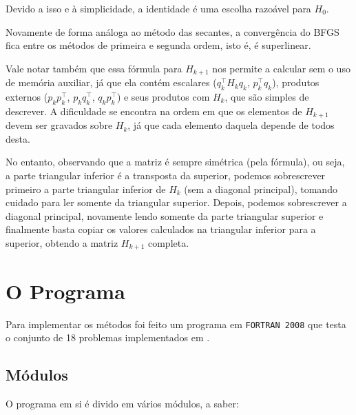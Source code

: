 \documentclass[a4paper,11pt]{article}
\begin{document}
            Devido a isso e à simplicidade, a identidade é uma escolha razoável para $H_0$.

            Novamente de forma análoga ao método das secantes, a convergência do BFGS fica entre os métodos de primeira e segunda ordem, isto é, é superlinear.

            Vale notar também que essa fórmula para $H_{k+1}$ nos permite a calcular sem o uso de memória auxiliar, já que ela contém escalares ($q_k^\top H_kq_k$, $p_k^\top q_k$),  produtos externos ($p_kp_k^\top$, $p_kq_k^\top$, $q_kp_k^\top$) e seus produtos com $H_k$, que são simples de descrever. A dificuldade se encontra na ordem em que os elementos de $H_{k+1}$ devem ser gravados sobre $H_k$, já que cada elemento daquela depende de todos desta.

            No entanto, observando que a matriz é sempre simétrica (pela fórmula), ou seja, a parte triangular inferior é a transposta da superior, podemos sobrescrever primeiro a parte triangular inferior de $H_k$ (sem a diagonal principal), tomando cuidado para ler somente da triangular superior. Depois, podemos sobrescrever a diagonal principal, novamente lendo somente da parte triangular superior e finalmente basta copiar os valores calculados na triangular inferior para a superior, obtendo a matriz $H_{k+1}$ completa.
    \newpage
    \section*{O Programa}
        Para implementar os métodos foi feito um programa em \texttt{FORTRAN 2008} que testa o conjunto de 18 problemas implementados em \citep*{More:1981:AFS:355934.355943}.

        \subsection*{Módulos}
            O programa em si é divido em vários módulos, a saber:
\end{document}
